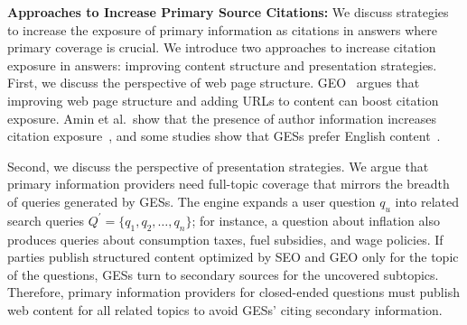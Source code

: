 \textbf{Approaches to Increase Primary Source Citations:}
We discuss strategies to increase the exposure of primary information as citations in answers where primary coverage is crucial.
We introduce two approaches to increase citation exposure in answers: improving content structure and presentation strategies.
First, we discuss the perspective of web page structure.
GEO~\cite{geo-apmr+24} argues that improving web page structure and adding URLs to content can boost citation exposure.
Amin et al.\ show that the presence of author information increases citation exposure~\cite{abolghasemi-etal-2025-evaluation}, and some studies show that GESs prefer English content~\cite{ki2025linguistic,cao2025out,stabler2025impact}.

Second, we discuss the perspective of presentation strategies.
We argue that primary information providers need full-topic coverage that mirrors the breadth of queries generated by GESs.
The engine expands a user question $q_u$ into related search queries $Q^{\prime} = \{q_1, q_2, \ldots, q_n\}$; for instance, a question about inflation also produces queries about consumption taxes, fuel subsidies, and wage policies.
If parties publish structured content optimized by SEO and GEO only for the topic of the questions, GESs turn to secondary sources for the uncovered subtopics.
Therefore, primary information providers for closed-ended questions must publish web content for all related topics to avoid GESs' citing secondary information.

